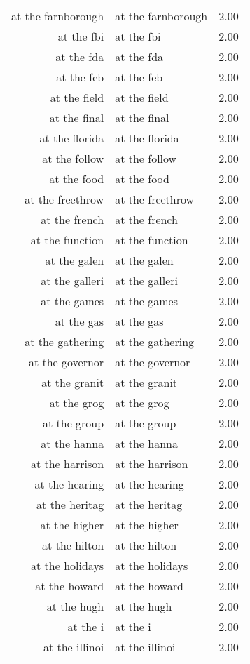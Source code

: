 \begin{table}[ht]
\begin{tabular}{rlr}
  at the farnborough & at the farnborough & 2.00 \\ 
  at the fbi & at the fbi & 2.00 \\ 
  at the fda & at the fda & 2.00 \\ 
  at the feb & at the feb & 2.00 \\ 
  at the field & at the field & 2.00 \\ 
  at the final & at the final & 2.00 \\ 
  at the florida & at the florida & 2.00 \\ 
  at the follow & at the follow & 2.00 \\ 
  at the food & at the food & 2.00 \\ 
  at the freethrow & at the freethrow & 2.00 \\ 
  at the french & at the french & 2.00 \\ 
  at the function & at the function & 2.00 \\ 
  at the galen & at the galen & 2.00 \\ 
  at the galleri & at the galleri & 2.00 \\ 
  at the games & at the games & 2.00 \\ 
  at the gas & at the gas & 2.00 \\ 
  at the gathering & at the gathering & 2.00 \\ 
  at the governor & at the governor & 2.00 \\ 
  at the granit & at the granit & 2.00 \\ 
  at the grog & at the grog & 2.00 \\ 
  at the group & at the group & 2.00 \\ 
  at the hanna & at the hanna & 2.00 \\ 
  at the harrison & at the harrison & 2.00 \\ 
  at the hearing & at the hearing & 2.00 \\ 
  at the heritag & at the heritag & 2.00 \\ 
  at the higher & at the higher & 2.00 \\ 
  at the hilton & at the hilton & 2.00 \\ 
  at the holidays & at the holidays & 2.00 \\ 
  at the howard & at the howard & 2.00 \\ 
  at the hugh & at the hugh & 2.00 \\ 
  at the i & at the i & 2.00 \\ 
  at the illinoi & at the illinoi & 2.00 \\ 

\end{tabular}
\end{table}
